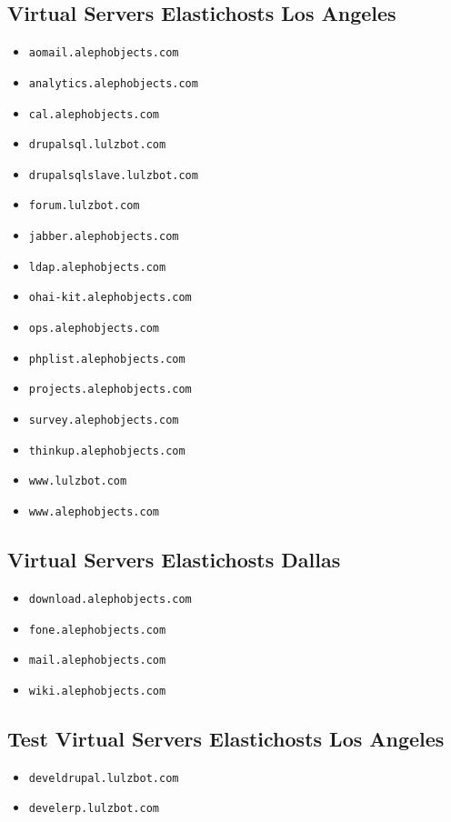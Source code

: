 \subsection{Virtual Servers Elastichosts Los Angeles}
\begin{itemize}
\item \texttt{aomail.alephobjects.com}
\item \texttt{analytics.alephobjects.com}
\item \texttt{cal.alephobjects.com}
\item \texttt{drupalsql.lulzbot.com}
\item \texttt{drupalsqlslave.lulzbot.com}
\item \texttt{forum.lulzbot.com}
\item \texttt{jabber.alephobjects.com}
\item \texttt{ldap.alephobjects.com}
\item \texttt{ohai-kit.alephobjects.com}
\item \texttt{ops.alephobjects.com}
\item \texttt{phplist.alephobjects.com}
\item \texttt{projects.alephobjects.com}
\item \texttt{survey.alephobjects.com}
\item \texttt{thinkup.alephobjects.com}
\item \texttt{www.lulzbot.com}
\item \texttt{www.alephobjects.com}
\end{itemize}

\subsection{Virtual Servers Elastichosts Dallas}
\begin{itemize}
\item \texttt{download.alephobjects.com}
\item \texttt{fone.alephobjects.com}
\item \texttt{mail.alephobjects.com}
\item \texttt{wiki.alephobjects.com}
\end{itemize}

\subsection{Test Virtual Servers Elastichosts Los Angeles}
\begin{itemize}
\item \texttt{develdrupal.lulzbot.com}
\item \texttt{develerp.lulzbot.com}
\end{itemize}

